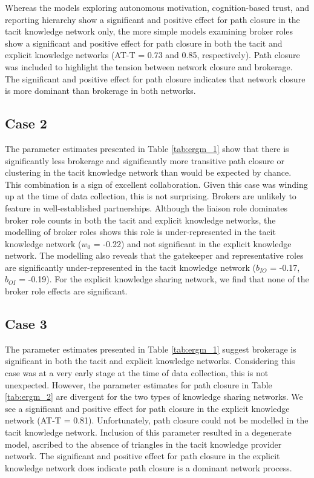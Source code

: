 Whereas the models exploring autonomous motivation, cognition-based trust, and reporting hierarchy show a significant and positive effect for path closure in the tacit knowledge network only, the more simple models examining broker roles show a significant and positive effect for path closure in both the tacit and explicit knowledge networks (AT-T = 0.73 and 0.85, respectively). Path closure was included to highlight the tension between network closure and brokerage. The significant and positive effect for path closure indicates that network closure is more dominant than brokerage in both networks. 

\subsection{Case 2}

The parameter estimates presented in Table \ref{tab:ergm_1} show that there is significantly less brokerage and significantly more transitive path closure or clustering in the tacit knowledge network than would be expected by chance. This combination is a sign of excellent collaboration. Given this case was winding up at the time of data collection, this is not surprising. Brokers are unlikely to feature in well-established partnerships. Although the liaison role dominates broker role counts in both the tacit and explicit knowledge networks, the modelling of broker roles shows this role is under-represented in the tacit knowledge network ($w_0$ = -0.22) and not significant in the explicit knowledge network. The modelling also reveals that the gatekeeper and representative roles are significantly under-represented in the tacit knowledge network ($b_{IO}$ = -0.17, $b_{OI}$ = -0.19). For the explicit knowledge sharing network, we find that none of the broker role effects are significant.

\subsection{Case 3}

The parameter estimates presented in Table \ref{tab:ergm_1} suggest brokerage is significant in both the tacit and explicit knowledge networks. Considering this case was at a very early stage at the time of data collection, this is not unexpected. However, the parameter estimates for path closure in Table \ref{tab:ergm_2} are divergent for the two types of knowledge sharing networks. We see a significant and positive effect for path closure in the explicit knowledge network (AT-T = 0.81). Unfortunately, path closure could not be modelled in the tacit knowledge network. Inclusion of this parameter resulted in a degenerate model, ascribed to the absence of triangles in the tacit knowledge provider network. The significant and positive effect for path closure in the explicit knowledge network does indicate path closure is a dominant network process. \medskip 

